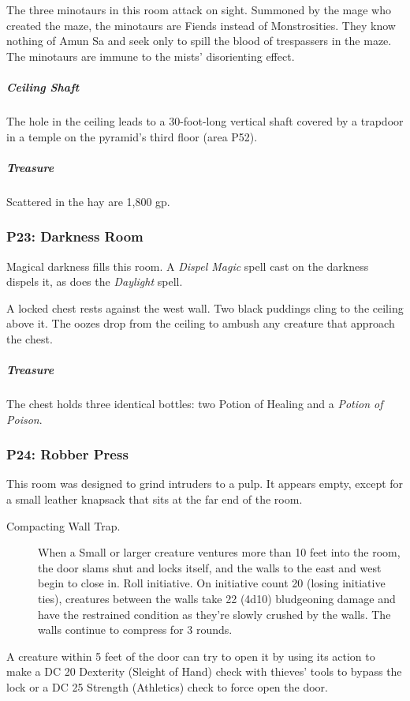 \documentclass[10pt,a4paper,twoside,bg=print,twocolumn,openany,nodeprecatedcode]{dndbook}
\begin{document}
The three minotaurs in this room attack on sight. Summoned by the mage who created the maze, the minotaurs are Fiends instead of Monstrosities. They know nothing of Amun Sa and seek only to spill the blood of trespassers in the maze. The minotaurs are immune to the mists' disorienting effect.

\subparagraph{Ceiling Shaft}
The hole in the ceiling leads to a 30-foot-long vertical shaft covered by a trapdoor in a temple on the pyramid's third floor (area P52).

\subparagraph{Treasure}
Scattered in the hay are 1,800 gp.

\subsubsection{P23: Darkness Room}
Magical darkness fills this room. A \textit{Dispel Magic} spell cast on the darkness dispels it, as does the \textit{Daylight} spell.

A locked chest rests against the west wall. Two black puddings cling to the ceiling above it. The oozes drop from the ceiling to ambush any creature that approach the chest.

\subparagraph{Treasure}
The chest holds three identical bottles: two Potion of Healing and a \textit{Potion of Poison}.

\subsubsection{P24: Robber Press}
This room was designed to grind intruders to a pulp. It appears empty, except for a small leather knapsack that sits at the far end of the room.


\begin{description}
\item[Compacting Wall Trap.]
When a Small or larger creature ventures more than 10 feet into the room, the door slams shut and locks itself, and the walls to the east and west begin to close in. Roll initiative. On initiative count 20 (losing initiative ties), creatures between the walls take 22 (4d10) bludgeoning damage and have the restrained condition as they're slowly crushed by the walls. The walls continue to compress for 3 rounds.
\end{description}

A creature within 5 feet of the door can try to open it by using its action to make a DC 20 Dexterity (Sleight of Hand) check with thieves' tools to bypass the lock or a DC 25 Strength (Athletics) check to force open the door.
\end{document}
